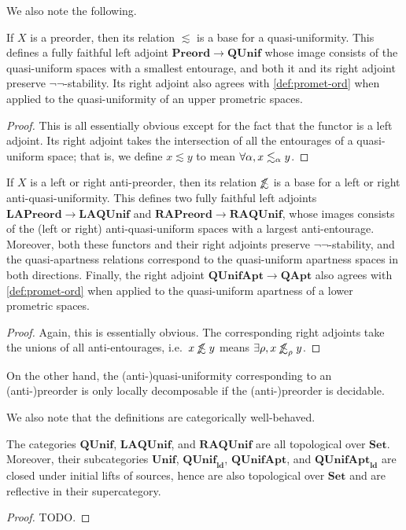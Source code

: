 \documentclass{article}
\def\oapt{\mathrel{\!\not\,\not\lesssim}}
\def\leapx{\lesssim}
\def\ent#1{\leapx_{#1}}
\def\aent#1{\oapt_{#1}}
\def\nn{\ensuremath{\neg\neg}}
\def\Set{\mathbf{Set}}
\def\Preord{\mathbf{Preord}}
\def\LAPreord{\mathbf{LAPreord}}
\def\RAPreord{\mathbf{RAPreord}}
\def\QApt{\mathbf{QApt}}
\def\QUnif{\mathbf{QUnif}}
\def\Unif{\mathbf{Unif}}
\def\ldQUnif{\mathbf{QUnif}_{\mathbf{ld}}}
\def\LAQUnif{\mathbf{LAQUnif}}
\def\RAQUnif{\mathbf{RAQUnif}}
\def\QUnifApt{\mathbf{QUnifApt}}
\def\ldQUnifApt{\mathbf{QUnifApt}_{\mathbf{ld}}}
\begin{document}
We also note the following.

\begin{thm}\label{thm:unif-ord}
  If $X$ is a preorder, then its relation $\leapx$ is a base for a quasi-uniformity.
  This defines a fully faithful left adjoint $\Preord\to\QUnif$ whose image consists of the quasi-uniform spaces with a smallest entourage, and both it and its right adjoint preserve \nn-stability.
  Its right adjoint also agrees with \cref{def:promet-ord} when applied to the quasi-uniformity of an upper prometric spaces.
\end{thm}
\begin{proof}
  This is all essentially obvious except for the fact that the functor is a left adjoint.
  Its right adjoint takes the intersection of all the entourages of a quasi-uniform space; that is, we define $x\leapx y$ to mean $\forall \al, x\ent\al y$.
\end{proof}

\begin{thm}\label{thm:aunif-ord}
  If $X$ is a left or right anti-preorder, then its relation $\oapt$ is a base for a left or right anti-quasi-uniformity.
  This defines two fully faithful left adjoints $\LAPreord \to \LAQUnif$ and $\RAPreord \to \RAQUnif$, whose images consists of the (left or right) anti-quasi-uniform spaces with a largest anti-entourage.
  Moreover, both these functors and their right adjoints preserve \nn-stability, and the quasi-apartness relations correspond to the quasi-uniform apartness spaces in both directions.
  Finally, the right adjoint $\QUnifApt \to \QApt$ also agrees with \cref{def:promet-ord} when applied to the quasi-uniform apartness of a lower prometric spaces.
\end{thm}
\begin{proof}
  Again, this is essentially obvious.
  The corresponding right adjoints take the unions of all anti-entourages, i.e.\ $x\oapt y$ means $\exists \rho, x\aent\rho y$.
\end{proof}

On the other hand, the (anti-)quasi-uniformity corresponding to an \mbox{(anti-)}pre\-order is only locally decomposable if the (anti-)preorder is decidable.

We also note that the definitions are categorically well-behaved.

\begin{thm}
  The categories $\QUnif$, $\LAQUnif$, and $\RAQUnif$ are all topological over $\Set$.
  Moreover, their subcategories $\Unif$, $\ldQUnif$, $\QUnifApt$, and $\ldQUnifApt$ are closed under initial lifts of sources, hence are also topological over $\Set$ and are reflective in their supercategory.
\end{thm}
\begin{proof}
  TODO.
\end{proof}
\end{document}

